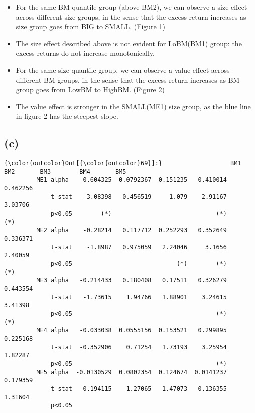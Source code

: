 \documentclass[10pt]{article}
\providecommand{\tightlist}{%
      \setlength{\itemsep}{0pt}\setlength{\parskip}{0pt}}
\begin{document}
    \begin{itemize}
\tightlist
\item
  For the same BM quantile group (above BM2), we can observe a size
  effect across different size groups, in the sense that the excess
  return increases as size group goes from BIG to SMALL. (Figure 1)
\item
  The size effect described above is not evident for LoBM(BM1) group:
  the excess returns do not increase monotonically.
\item
  For the same size quantile group, we can observe a value effect across
  different BM groups, in the sense that the excess return increases as
  BM group goes from LowBM to HighBM. (Figure 2)
\item
  The value effect is stronger in the SMALL(ME1) size group, as the blue
  line in figure 2 has the steepest slope.
\end{itemize}

    \subsection{(c)}\label{c}


            \begin{Verbatim}[commandchars=\\\{\}]
{\color{outcolor}Out[{\color{outcolor}69}]:}                   BM1        BM2       BM3        BM4       BM5
         ME1 alpha   -0.604325  0.0792367  0.151235   0.410014  0.462256
             t-stat   -3.08398   0.456519     1.079    2.91167   3.03706
             p<0.05        (*)                             (*)       (*)
         ME2 alpha    -0.28214   0.117712  0.252293   0.352649  0.336371
             t-stat    -1.8987   0.975059   2.24046     3.1656   2.40059
             p<0.05                             (*)        (*)       (*)
         ME3 alpha   -0.214433   0.180408   0.17511   0.326279  0.443554
             t-stat   -1.73615    1.94766   1.88901    3.24615   3.41398
             p<0.05                                        (*)       (*)
         ME4 alpha   -0.033038  0.0555156  0.153521   0.299895  0.225168
             t-stat  -0.352906    0.71254   1.73193    3.25954   1.82287
             p<0.05                                        (*)          
         ME5 alpha  -0.0130529  0.0802354  0.124674  0.0141237  0.179359
             t-stat  -0.194115    1.27065   1.47073   0.136355   1.31604
             p<0.05                                                     
\end{Verbatim}
        
\end{document}
